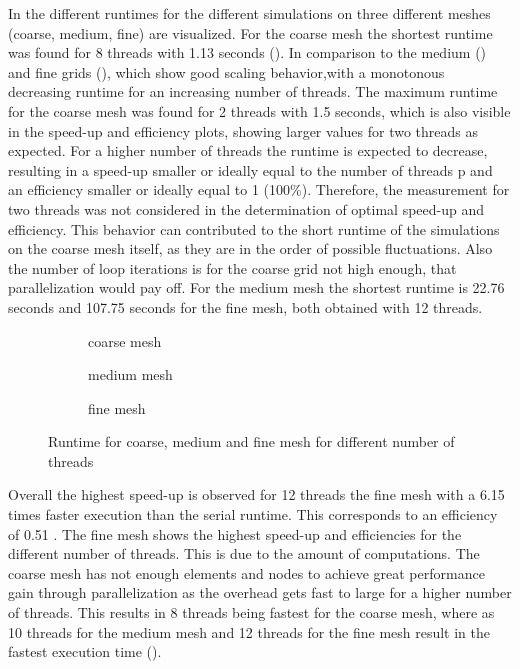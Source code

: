 In  the different runtimes for the different simulations on three different meshes (coarse, medium, fine) are visualized.
For the coarse mesh the shortest runtime was found for 8 threads with 1.13 seconds (). In comparison to the medium () and fine grids (), which show good scaling behavior,with a monotonous decreasing runtime for an increasing number of threads. The maximum runtime for the coarse mesh was found for 2 threads with 1.5 seconds, which is also visible in the speed-up and efficiency plots, showing larger values for two threads as expected. For a higher number of threads the runtime is expected to decrease, resulting in a speed-up smaller or ideally equal to the number of threads p and an efficiency smaller or ideally equal to 1 (100\%).
Therefore, the measurement for two threads was not considered in the determination of optimal speed-up and efficiency. This behavior can contributed to the short runtime of the simulations on the coarse mesh itself, as they are in the order of possible fluctuations. Also the number of loop iterations is for the coarse grid not high enough, that parallelization would pay off. For the medium mesh the shortest runtime is 22.76 seconds and 107.75 seconds for the fine mesh, both obtained with 12 threads.
%
\begin{figure}[h!]
	\centering
	\begin{subfigure}{0.7\textwidth}
		\centering
		\resizebox{0.57\width}{!}{}
		\caption{\label{fig::Rcoarse} coarse mesh}
	\end{subfigure}
	\hfill
	\begin{subfigure}{0.7\textwidth}
		\centering
		\resizebox{0.57\width}{!}{}
		\caption{\label{fig::Rmedium} medium mesh}
	\end{subfigure}
	\hfill
	\begin{subfigure}{0.7\textwidth}
		\centering
		\resizebox{0.57\width}{!}{}
		\caption{\label{fig::Rfine} fine mesh}
	\end{subfigure}
	\caption{\label{fig::Runtime} Runtime for coarse, medium and fine mesh for different number of threads}
\end{figure}

\clearpage \noindent
Overall the highest speed-up is observed for 12 threads the fine mesh with a 6.15 times faster execution than the serial runtime. This corresponds to an efficiency of 0.51 . The fine mesh shows the highest speed-up and efficiencies for the different number of threads. This is due to the amount of computations. The coarse mesh has not enough elements and nodes to achieve great performance gain through parallelization as the overhead gets fast to large for a higher number of threads. This results in 8 threads being fastest for the coarse mesh, where as 10 threads for the medium mesh and 12 threads for the fine mesh result in the fastest execution time ().

